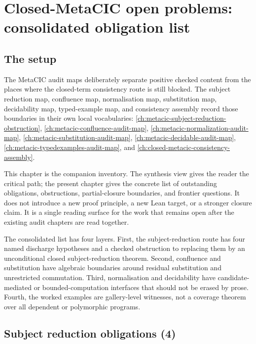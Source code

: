 \chapter{Closed-MetaCIC open problems: consolidated obligation list}
\label{ch:metacic-open-problems}

\section{The setup}
\label{sec:metacic-open-problems-setup}

The MetaCIC audit maps deliberately separate positive checked content from the
places where the closed-term consistency route is still blocked. The subject
reduction map, confluence map, normalisation map, substitution map,
decidability map, typed-example map, and consistency assembly record those
boundaries in their own local vocabularies:
\autoref{ch:metacic-subject-reduction-obstruction},
\autoref{ch:metacic-confluence-audit-map},
\autoref{ch:metacic-normalization-audit-map},
\autoref{ch:metacic-substitution-audit-map},
\autoref{ch:metacic-decidable-audit-map},
\autoref{ch:metacic-typedexamples-audit-map}, and
\autoref{ch:closed-metacic-consistency-assembly}.

This chapter is the companion inventory. The synthesis view gives the reader
the critical path; the present chapter gives the concrete list of outstanding
obligations, obstructions, partial-closure boundaries, and frontier questions.
It does not introduce a new proof principle, a new Lean target, or a stronger
closure claim. It is a single reading surface for the work that remains open
after the existing audit chapters are read together.

The consolidated list has four layers. First, the subject-reduction route has
four named discharge hypotheses and a checked obstruction to replacing them by
an unconditional closed subject-reduction theorem. Second, confluence and
substitution have algebraic boundaries around residual substitution and
unrestricted commutation. Third, normalisation and decidability have
candidate-mediated or bounded-computation interfaces that should not be erased
by prose. Fourth, the worked examples are gallery-level witnesses, not a
coverage theorem over all dependent or polymorphic programs.

\section{Subject reduction obligations (4)}
\label{sec:metacic-open-problems-subject-reduction}

